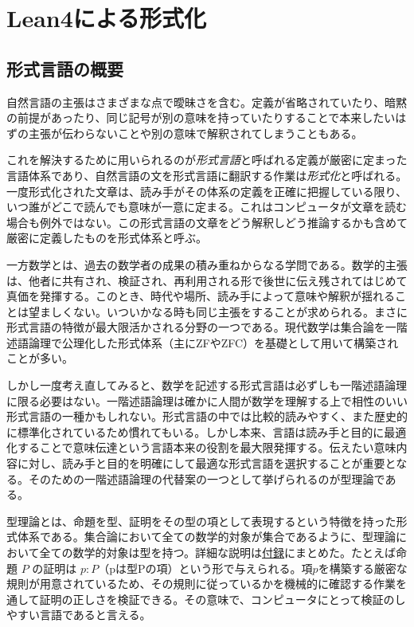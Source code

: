 \documentclass[a4paper,12pt]{bxjsbook}
\newlength{\customindent}
\newenvironment{body}{
  \par
  \begingroup
  \setlength{\leftskip}{\customindent}
  \setlength{\rightskip}{0pt}
  \setlength{\parindent}{1em}
  \setlength{\displayindent}{\customindent}
  \setlength{\displaywidth}{\dimexpr\linewidth-\customindent\relax}
}{
  \par
  \endgroup
}
\theoremstyle{theorem}
\begin{document}
    \chapter{Lean4による形式化}
    \section{形式言語の概要}
    \begin{body}
        \indent 自然言語の主張はさまざまな点で曖昧さを含む。定義が省略されていたり、暗黙の前提があったり、同じ記号が別の意味を持っていたりすることで本来したいはずの主張が伝わらないことや別の意味で解釈されてしまうこともある。

        \indent これを解決するために用いられるのが\emph{形式言語}と呼ばれる定義が厳密に定まった言語体系であり、自然言語の文を形式言語に翻訳する作業は\emph{形式化}と呼ばれる。一度形式化された文章は、読み手がその体系の定義を正確に把握している限り、いつ誰がどこで読んでも意味が一意に定まる。これはコンピュータが文章を読む場合も例外ではない。この形式言語の文章をどう解釈しどう推論するかも含めて厳密に定義したものを形式体系と呼ぶ。

        \indent 一方数学とは、過去の数学者の成果の積み重ねからなる学問である。数学的主張は、他者に共有され、検証され、再利用される形で後世に伝え残されてはじめて真価を発揮する。このとき、時代や場所、読み手によって意味や解釈が揺れることは望ましくない。いついかなる時も同じ主張をすることが求められる。まさに形式言語の特徴が最大限活かされる分野の一つである。現代数学は集合論を一階述語論理で公理化した形式体系（主にZFやZFC）を基礎として用いて構築されことが多い。

        \indent しかし一度考え直してみると、数学を記述する形式言語は必ずしも一階述語論理に限る必要はない。一階述語論理は確かに人間が数学を理解する上で相性のいい形式言語の一種かもしれない。形式言語の中では比較的読みやすく、また歴史的に標準化されているため慣れてもいる。しかし本来、言語は読み手と目的に最適化することで意味伝達という言語本来の役割を最大限発揮する。伝えたい意味内容に対し、読み手と目的を明確にして最適な形式言語を選択することが重要となる。そのための一階述語論理の代替案の一つとして挙げられるのが型理論である。

        \indent 型理論とは、命題を型、証明をその型の項として表現するという特徴を持った形式体系である。集合論において全ての数学的対象が集合であるように、型理論において全ての数学的対象は型を持つ。詳細な説明は\hyperref[appendix:type-theory]{付録}にまとめた。たとえば命題 $P$ の証明は $p:P$（pは型Pの項）という形で与えられる。項$p$を構築する厳密な規則が用意されているため、その規則に従っているかを機械的に確認する作業を通して証明の正しさを検証できる。その意味で、コンピュータにとって検証のしやすい言語であると言える。

    \end{body}
\end{document}
